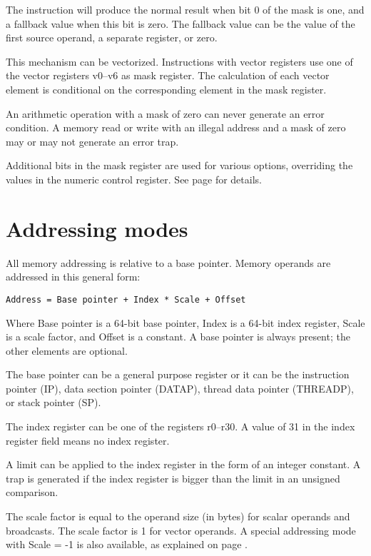 \documentclass[forwardcom.tex]{subfiles}
\begin{document}
The instruction will produce the normal result when bit 0 of the mask is one, and a fallback value when this bit is zero. The fallback value can be the value of the first source operand, a separate register, or zero.
\vv

This mechanism can be vectorized. Instructions with vector registers use one of the vector registers v0--v6 as mask register. The calculation of each vector element is conditional on the corresponding element in the mask register.
\vv

An arithmetic operation with a mask of zero can never generate an error condition. 
A memory read or write with an illegal address and a mask of zero may or may not generate an error trap.
\vv

Additional bits in the mask register are used for various options, overriding the values in the numeric control register. See page \pageref{table:maskBits} for details.

\section{Addressing modes}
All memory addressing is relative to a base pointer. Memory operands are addressed in this general form:

\begin{lstlisting}
Address = Base pointer + Index * Scale + Offset
\end{lstlisting}

Where Base pointer is a 64-bit base pointer, Index is a 64-bit index register, Scale is a scale factor, and Offset is a constant. A base pointer is always present; the other elements are optional. 
\vv

The base pointer can be a general purpose register or it can be the 
instruction pointer (IP), data section pointer (DATAP), thread data pointer (THREADP), or stack pointer (SP).
\vv

The index register can be one of the registers r0--r30. A value of 31 in the index register field means no index register.
\vv

A limit can be applied to the index register in the form of an integer constant. A trap is generated if the index register is bigger than the limit in an unsigned comparison.
\vv

The scale factor is equal to the operand size (in bytes) for scalar operands and broadcasts. The scale factor is 1 for vector operands. A special addressing mode with 
Scale = -1 
is also available, as explained on page \pageref{vectorLoops}.
\vv
\end{document}
